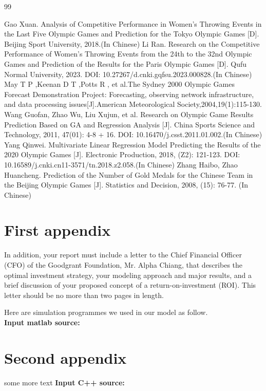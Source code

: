 \documentclass{mcmthesis}
\begin{document}
\newpage

\begin{thebibliography}{99}

 Gao Xuan. Analysis of Competitive Performance in Women's Throwing Events in the Last Five Olympic Games and Prediction for the Tokyo Olympic Games [D]. Beijing Sport University, 2018.(In Chinese) 
 Li Ran. Research on the Competitive Performance of Women's Throwing Events from the 24th to the 32nd Olympic Games and Prediction of the Results for the Paris Olympic Games [D]. Qufu Normal University, 2023. DOI: 10.27267/d.cnki.gqfsu.2023.000828.(In Chinese) 
 May T P ,Keenan D T ,Potts R , et al.The Sydney 2000 Olympic Games Forecast Demonstration Project: Forecasting, observing network infrastructure, and data processing issues[J].American Meteorological Society,2004,19(1):115-130.
 Wang Guofan, Zhao Wu, Liu Xujun, et al. Research on Olympic Game Results Prediction Based on GA and Regression Analysis [J]. China Sports Science and Technology, 2011, 47(01): 4-8 + 16. DOI: 10.16470/j.csst.2011.01.002.(In Chinese) 
 Yang Qinwei. Multivariate Linear Regression Model Predicting the Results of the 2020 Olympic Games [J]. Electronic Production, 2018, (Z2): 121-123. DOI: 10.16589/j.cnki.cn11-3571/tn.2018.z2.058.(In Chinese)
 Zhang Haibo, Zhao Huancheng. Prediction of the Number of Gold Medals for the Chinese Team in the Beijing Olympic Games [J]. Statistics and Decision, 2008, (15): 76-77. (In Chinese)

\end{thebibliography}

\begin{appendices}

\section{First appendix}

In addition, your report must include a letter to the Chief Financial Officer (CFO) of the Goodgrant Foundation, Mr. Alpha Chiang, that describes the optimal investment strategy, your modeling approach and major results, and a brief discussion of your proposed concept of a return-on-investment (ROI). This letter should be no more than two pages in length.

Here are simulation programmes we used in our model as follow.\\

\textbf{\textcolor[rgb]{0.98,0.00,0.00}{Input matlab source:}}


\section{Second appendix}

some more text \textcolor[rgb]{0.98,0.00,0.00}{\textbf{Input C++ source:}}


\end{appendices}
\end{document}
